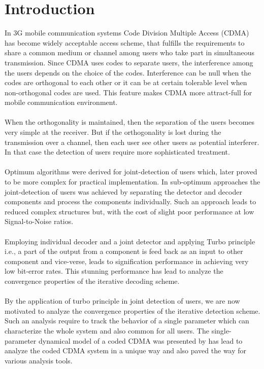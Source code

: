 \chapter{Introduction}
In 3G mobile communication systems Code Division Multiple Access (CDMA) has become widely acceptable access scheme, that fulfills the requirements to share a common medium or channel among users who take part in simultaneous transmission. Since CDMA uses codes to separate users, the interference among the users depends on the choice of the codes. Interference can be null when the codes are orthogonal to each other or it can be at certain tolerable level when non-orthogonal codes are used. This feature makes CDMA more attract-full for mobile communication environment. \\ \\
When the orthogonality is maintained, then the separation of the users becomes very simple at the receiver. But if the orthogonality is lost during the transmission over a channel, then each user see other users as potential interferer. In that case the detection of users require more sophisticated treatment. \\ \\
Optimum algorithms were derived for joint-detection of users which, later proved to be more complex for practical implementation. In sub-optimum approaches the joint-detection of users was achieved by separating the detector and decoder components and process the components individually. Such an approach leads to reduced complex structures but, with the cost of slight poor performance at low Signal-to-Noise ratios. \\ \\
Employing individual decoder and a joint detector and applying Turbo principle \cite{TUR} i.e., a part of the output from a component is feed back as an input to other component and vice-verse, leads to signification performance in achieving very low bit-error rates. This stunning performance has lead to analyze the convergence properties of the iterative decoding scheme.\\ \\
By the application of turbo principle in joint detection of users, we are now motivated to analyze the convergence properties of the iterative detection scheme. Such an analysis require to track the behavior of a single parameter which can characterize the whole system  and also common for all users. The single-parameter dynamical model of a coded CDMA was presented by \cite{JC} has lead to analyze the coded CDMA system in a unique way and also paved the way for various analysis tools. \\ \\
